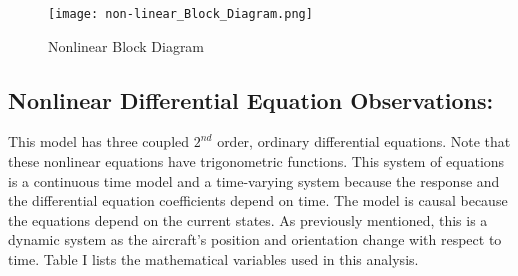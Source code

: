 \documentclass[conference]{IEEEtran}
\begin{document}
\begin{figure}[!h]
\centerline{\texttt{[image: non-linear\_Block\_Diagram.png]}}
\caption{Nonlinear Block Diagram}
\label{figure}
\end{figure}

\subsection{Nonlinear Differential Equation Observations:}
This model has three coupled $2^{nd}$ order, ordinary differential equations. Note that these nonlinear equations have trigonometric functions. This system of equations is a continuous time model and a time-varying system because the response and the differential equation coefficients depend on time. The model is causal because the equations depend on the current states. As previously mentioned, this is a dynamic system as the aircraft's position and orientation change with respect to time. Table I lists the mathematical variables used in this analysis.\\
\end{document}
